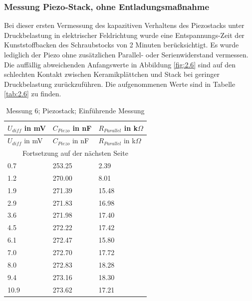 \documentclass[12pt]{scrreprt} %
\begin{document}
\subsubsection{Messung Piezo-Stack, ohne Entladungsmaßnahme}
Bei dieser ersten Vermessung des kapazitiven Verhaltens des Piezostacks unter Druckbelastung in elektrischer Feldrichtung wurde eine Entspannungs-Zeit der Kunststoffbacken des Schraubstocks von 2 Minuten berücksichtigt. Es wurde lediglich der Piezo ohne zusätzlichen Parallel- oder Serienwiderstand vermessen. Die auffällig abweichenden Anfangswerte in Abbildung \vref{fig:2.6} sind auf den schlechten Kontakt zwischen Keramikplättchen und Stack bei geringer Druckbelastung zurückzuführen. Die aufgenommenen Werte sind in Tabelle \vref{tab:2.6} zu finden.

\setlongtables
\begin{longtable}{| l |l| l |}
\caption{Messung 6; Piezostack; Einführende Messung}\\
\hline
$U_{diff}$ in mV&$C_{Piezo}$ in nF&$R_{Parallel}$ in k$\Omega$\\
\hline
\endfirsthead
\hline
$U_{diff}$ in mV&$C_{Piezo}$ in nF&$R_{Parallel}$ in k$\Omega$\\
\hline
\endhead
\hline
\multicolumn{3}{|c|}{Fortsetzung auf der nächsten Seite}\\
\hline
\endfoot
\hline \hline
\endlastfoot
\hline
\label{tab:2.6}%
0.7&253.25&2.39\\
1.2&270.00&8.01\\
1.9&271.39&15.48\\
2.9&271.83&16.98\\
3.6&271.98&17.40\\
4.5&272.22&17.42\\
6.1&272.47&15.80\\
7.0&272.70&17.72\\
8.0&272.83&18.28\\
9.4&273.16&18.30\\
10.9&273.62&17.21\\
\end{longtable}
\end{document}
